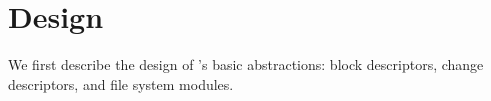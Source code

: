 \section{Design}
\label{sec:design}

We first describe the design of \Kudos's basic abstractions: block
descriptors, change descriptors, and file system modules.



